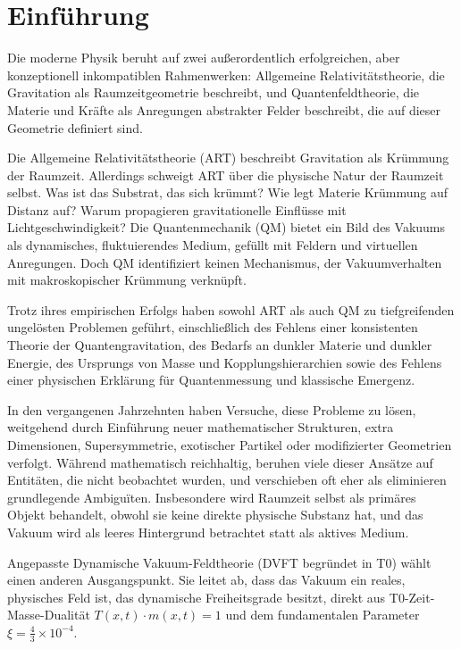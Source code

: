 \documentclass[12pt,a4paper]{article}
\begin{document}
	\section{Einführung}
	
	Die moderne Physik beruht auf zwei außerordentlich erfolgreichen, aber konzeptionell inkompatiblen Rahmenwerken:
	Allgemeine Relativitätstheorie, die Gravitation als Raumzeitgeometrie beschreibt, und Quantenfeldtheorie, die Materie und Kräfte als Anregungen abstrakter Felder beschreibt, die auf dieser Geometrie definiert sind.
	
	Die Allgemeine Relativitätstheorie (ART) beschreibt Gravitation als Krümmung der Raumzeit.
	Allerdings schweigt ART über die physische Natur der Raumzeit selbst.
	Was ist das Substrat, das sich krümmt?
	Wie legt Materie Krümmung auf Distanz auf?
	Warum propagieren gravitationelle Einflüsse mit Lichtgeschwindigkeit?
	Die Quantenmechanik (QM)
	bietet ein Bild des Vakuums als dynamisches, fluktuierendes Medium, gefüllt mit Feldern und virtuellen Anregungen.
	Doch QM identifiziert keinen Mechanismus, der Vakuumverhalten mit makroskopischer Krümmung verknüpft.
	
	Trotz ihres empirischen Erfolgs haben sowohl ART als auch QM zu tiefgreifenden ungelösten Problemen geführt, einschließlich
	des Fehlens einer konsistenten Theorie der Quantengravitation, des Bedarfs an dunkler Materie und dunkler Energie, des Ursprungs
	von Masse und Kopplungshierarchien sowie des Fehlens einer physischen Erklärung für Quantenmessung und
	klassische Emergenz.
	
	In den vergangenen Jahrzehnten haben Versuche, diese Probleme zu lösen, weitgehend durch Einführung neuer mathematischer Strukturen, extra Dimensionen, Supersymmetrie, exotischer Partikel oder modifizierter Geometrien verfolgt.
	Während mathematisch reichhaltig, beruhen viele dieser Ansätze auf Entitäten, die nicht beobachtet wurden, und verschieben oft eher als eliminieren grundlegende Ambiguïten.
	Insbesondere wird Raumzeit selbst als primäres Objekt behandelt, obwohl sie keine direkte physische Substanz hat, und das Vakuum wird als leeres Hintergrund betrachtet statt als aktives Medium.
	
	Angepasste Dynamische Vakuum-Feldtheorie (DVFT begründet in T0) wählt einen anderen Ausgangspunkt.
	Sie leitet ab, dass das Vakuum ein reales, physisches Feld ist, das dynamische Freiheitsgrade besitzt, direkt aus T0-Zeit-Masse-Dualität $T(x,t) \cdot m(x,t) = 1$ und dem fundamentalen Parameter $\xi = \frac{4}{3} \times 10^{-4}$.
	
\end{document}
